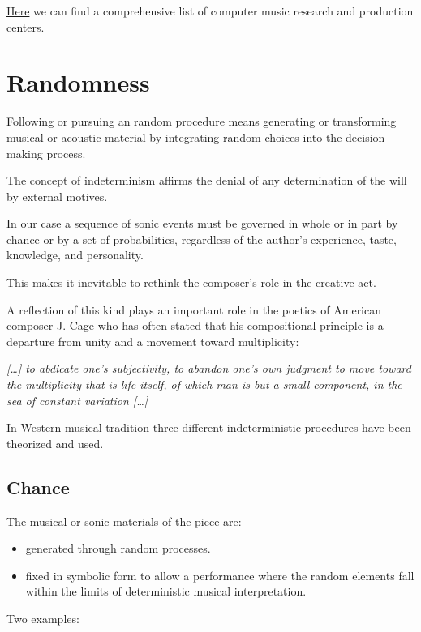 \href{https://smcnetwork.org/centers.html}{Here} we can find a comprehensive list of computer music research and production centers.

\section{Randomness}\label{randomness}

Following or pursuing an random procedure means generating or transforming musical or acoustic material by integrating random choices into the decision-making process.

The concept of indeterminism affirms the denial of any determination of the will by external motives.

In our case a sequence of sonic events must be governed in whole or in part by chance or by a set of probabilities, regardless of the author's experience, taste, knowledge, and personality.

This makes it inevitable to rethink the composer's role in the creative act.

A reflection of this kind plays an important role in the poetics of American composer J. Cage who has often stated that his compositional principle is a departure from unity and a movement toward multiplicity:

\textit{ {[}\ldots{]} to abdicate one's subjectivity, to abandon one's own judgment to move toward the multiplicity that is life itself, of which man is but a small component, in the sea of constant variation
{[}\ldots{]}}

In Western musical tradition three different indeterministic procedures have been theorized and used.


\subsection{Chance }\label{chance}

The musical or sonic materials of the piece are:

\begin{itemize}
\tightlist
\item generated through random processes. 
\item fixed in symbolic form to allow a performance where the random elements fall within the limits of deterministic musical interpretation.
\end{itemize}

Two examples:

